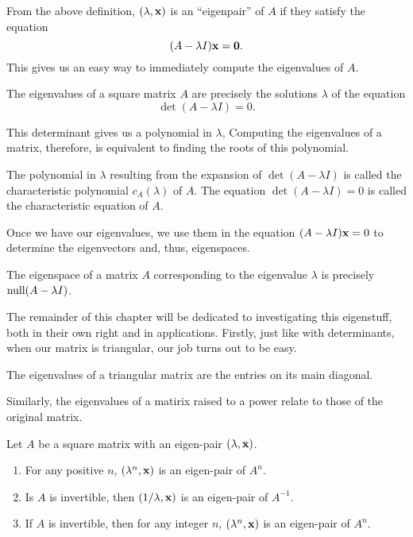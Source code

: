 \documentclass[../m73main.tex]{chapters}
\begin{document}
From the above definition, $(\lambda, \mathbf{x})$ is an ``eigenpair'' of $A$ if they satisfy the equation
\[ (A - \lambda I) \mathbf{x} = \mathbf{0}. \]
This gives us an easy way to immediately compute the eigenvalues of $A$.

\begin{theorem}
	The eigenvalues of a square matrix $A$ are precisely the solutions $\lambda$ of the equation
	\[ \det (A - \lambda I) = 0. \]
\end{theorem}

This determinant gives us a polynomial in $\lambda$,
Computing the eigenvalues of a matrix, therefore, is equivalent to finding the roots of this polynomial.

\begin{definition}
	The polynomial in $\lambda$ resulting from the expansion of $\det (A - \lambda I)$ is called the characteristic polynomial $c_A (\lambda)$ of $A$.
	The equation $\det (A - \lambda I) = 0$ is called the characteristic equation of $A$.
\end{definition}

Once we have our eigenvalues, we use them in the equation $(A - \lambda I) \mathbf{x} = 0$ to determine the eigenvectors and, thus, eigenspaces.

\begin{theorem}
	The eigenspace of a matrix $A$ corresponding to the eigenvalue $\lambda$ is precisely $\textrm{null} (A - \lambda I)$.
\end{theorem}

The remainder of this chapter will be dedicated to investigating this eigenstuff, both in their own right and in applications.
Firstly, just like with determinants, when our matrix is triangular, our job turns out to be easy.

\begin{theorem}
	The eigenvalues of a triangular matrix are the entries on its main diagonal.
\end{theorem}

Similarly, the eigenvalues of a matirix raised to a power relate to those of the original matrix.

\begin{theorem}
	Let $A$ be a square matrix with an eigen-pair $(\lambda, \mathbf{x})$.
	\begin{enumerate}[label=(\alph*)]
		\item For any positive $n$, $(\lambda^n, \mathbf{x})$ is an eigen-pair of $A^n$.
		\item Is $A$ is invertible, then $(1/\lambda, \mathbf{x})$ is an eigen-pair of $A^{-1}$.
		\item If $A$ is invertible, then for any integer $n$, $(\lambda^n, \mathbf{x})$ is an eigen-pair of $A^n$.
	\end{enumerate}
\end{theorem}
\end{document}
